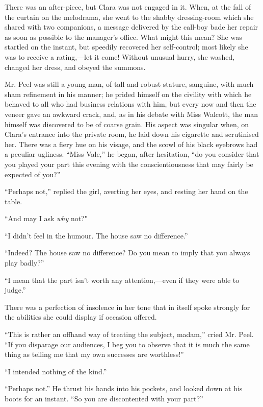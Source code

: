 There was an after-piece, but Clara was not engaged in it. When, at the
fall of the curtain on the melodrama, she went to the shabby
dressing-room which she shared with two companions, a message delivered
by the call-boy bade her repair as soon as possible to the manager's
office. What might this mean? She was startled on the instant, but
speedily recovered her self-control; most likely she was to receive a
rating,---let it come! Without unusual hurry, she washed, changed her
dress, and obeyed the summons.

Mr. Peel was still a young man, of tall and robust stature, sanguine,
with much sham refinement in his manner; he prided himself on
{\protect\hypertarget{206}{}{}}the civility with which he behaved to all
who had business relations with him, but every now and then the veneer
gave an awkward crack, and, as in his debate with Miss Walcott, the man
himself was discovered to be of coarse grain. His aspect was singular
when, on Clara's entrance into the private room, he laid down his
cigarette and scrutinised her. There was a fiery hue on his visage, and
the scowl of his black eyebrows had a peculiar ugliness. ``Miss Vale,''
he began, after hesitation, ``do you consider that you played your part
this evening with the conscientiousness that may fairly be expected of
you?''

``Perhaps not,'' replied the girl, averting her eyes, and resting her
hand on the table.

``And may I ask \emph{why} not?"

``I didn't feel in the humour. The house saw no difference.''

``Indeed? The house saw no difference? Do you mean to imply that you
always play badly?''

``I mean that the part isn't worth any attention,---even if they were
able to judge.''

{\protect\hypertarget{207}{}{}}There was a perfection of insolence in
her tone that in itself spoke strongly for the abilities she could
display if occasion offered.

``This is rather an offhand way of treating the subject, madam,'' cried
Mr. Peel. ``If you disparage our audiences, I beg you to observe that it
is much the same thing as telling me that my own successes are
worthless!''

``I intended nothing of the kind.''

``Perhaps not.'' He thrust his hands into his pockets, and looked down
at his boots for an instant. ``So you are discontented with your part?''

